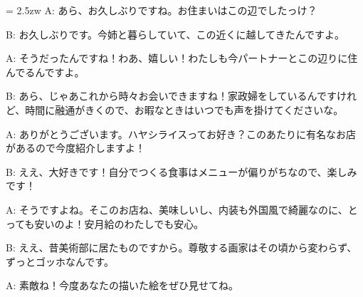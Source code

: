 \documentclass[11pt]{amsart}
\title{}
\author{}
\newenvironment{hangall}[1]{\hangindent = 2.5zw\everypar{\hangindent = 2.5zw}}{}
\begin{document}
\maketitle
\begin{hangall}{}%
A: あら、お久しぶりですね。お住まいはこの辺でしたっけ？



B: お久しぶりです。今姉と暮らしていて、この近くに越してきたんですよ。



A: そうだったんですね！わあ、嬉しい！わたしも今パートナーとこの辺りに住んでるんですよ。



B: あら、じゃあこれから時々お会いできますね！家政婦をしているんですけれど、時間に融通がきくので、お暇なときはいつでも声を掛けてくださいな。



A: ありがとうございます。ハヤシライスってお好き？このあたりに有名なお店があるので今度紹介しますよ！



B: ええ、大好きです！自分でつくる食事はメニューが偏りがちなので、楽しみです！



A: そうですよね。そこのお店ね、美味しいし、内装も外国風で綺麗なのに、とっても安いのよ！安月給のわたしでも安心。



B: ええ、昔美術部に居たものですから。尊敬する画家はその頃から変わらず、ずっとゴッホなんです。



A: 素敵ね！今度あなたの描いた絵をぜひ見せてね。\end{hangall}
\end{document}
